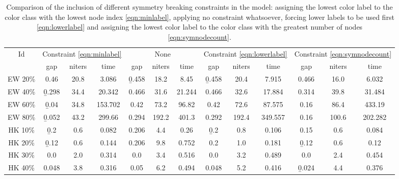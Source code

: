 \begin{table}

\centering

\begin{tabular}{|c|ccc|ccc|ccc|ccc|}
\hline
\multicolumn{1}{|c|}{Id} & \multicolumn{3}{|c|}{Constraint \ref{eqn:minlabel}} & \multicolumn{3}{|c|}{None} & \multicolumn{3}{|c|}{Constraint \ref{eqn:lowerlabel}} & \multicolumn{3}{|c|}{Constraint \ref{eqn:symnodecount}}
\\
 & gap & niters & time & gap & niters & time & gap & niters & time & gap & niters & time
\\
\hline
EW 20\% & 0.46 & 20.8 & 3.086 & \b{0.458} & 18.2 & 8.45 & \b{0.458} & 20.4 & 7.915 & 0.466 & 16.0 & 6.032
\\
EW 40\% & \b{0.298} & 34.4 & 20.342 & 0.466 & 31.6 & 21.244 & 0.466 & 32.6 & 17.884 & 0.314 & 39.8 & 31.484
\\
EW 60\% & \b{0.04} & 34.8 & 153.702 & 0.42 & 73.2 & 96.82 & 0.42 & 72.6 & 87.575 & 0.16 & 86.4 & 433.19
\\
EW 80\% & \b{0.052} & 43.2 & 299.66 & 0.294 & 192.2 & 401.3 & 0.292 & 192.4 & 349.557 & 0.16 & 100.6 & 202.282
\\
\hline
HK 10\% &  \b{0.2} &  0.6 & 0.082 & 0.206 &  4.4 & 0.26 &  \b{0.2} &  0.8 & 0.106 & 0.15 &  0.6 & 0.084
\\
HK 20\% & \b{0.12} &  0.6 & 0.144 & 0.206 &  9.8 & 0.752 &  0.2 &  1.0 & 0.181 & \b{0.12} &  0.6 & 0.12
\\
HK 30\% &  0.0 &  2.0 & 0.314 &  0.0 &  3.4 & 0.516 &  0.0 &  3.2 & 0.489 &  0.0 &  2.4 & 0.454
\\
HK 40\% & 0.048 &  3.8 & 0.316 & 0.05 &  6.2 & 0.494 & 0.048 &  5.2 & 0.416 & \b{0.024} &  4.4 & 0.376
\\
\hline 
 \end{tabular}

\caption{Comparison of the inclusion of different symmetry breaking constraints in the model: assigning the lowest color label to the color class with the lowest node index \eqref{eqn:minlabel}, applying no constraint whatsoever, forcing lower labels to be used first \eqref{eqn:lowerlabel} and assigning the lowest color label to the color class with the greatest number of nodes \eqref{eqn:symnodecount}.}
\label{table:models:sym}

\end{table}

